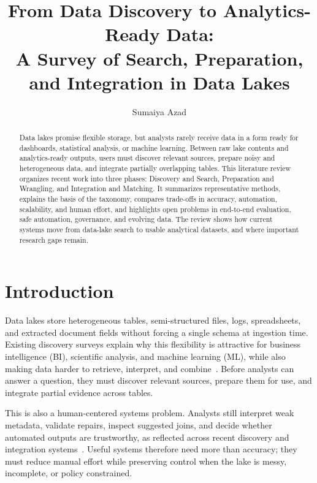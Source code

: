 \documentclass[sigconf]{acmart}
\begin{document}
\pagestyle{plain}

\title{From Data Discovery to Analytics-Ready Data:\\A Survey of Search, Preparation, and Integration in Data Lakes}

\author{Sumaiya Azad}

\renewcommand{\shortauthors}{Azad}

\begin{abstract}
Data lakes promise flexible storage, but analysts rarely receive data in a form ready for dashboards, statistical analysis, or machine learning. Between raw lake contents and analytics-ready outputs, users must discover relevant sources, prepare noisy and heterogeneous data, and integrate partially overlapping tables. This literature review organizes recent work into three phases: Discovery and Search, Preparation and Wrangling, and Integration and Matching. It summarizes representative methods, explains the basis of the taxonomy, compares trade-offs in accuracy, automation, scalability, and human effort, and highlights open problems in end-to-end evaluation, safe automation, governance, and evolving data. The review shows how current systems move from data-lake search to usable analytical datasets, and where important research gaps remain.
\end{abstract}

\maketitle

\section{Introduction}
Data lakes store heterogeneous tables, semi-structured files, logs, spreadsheets, and extracted document fields without forcing a single schema at ingestion time. Existing discovery surveys explain why this flexibility is attractive for business intelligence (BI), scientific analysis, and machine learning (ML), while also making data harder to retrieve, interpret, and combine~\cite{10.1145/3555041.3589409,10.14778/3750601.3750694}. Before analysts can answer a question, they must discover relevant sources, prepare them for use, and integrate partial evidence across tables.

This is also a human-centered systems problem. Analysts still interpret weak metadata, validate repairs, inspect suggested joins, and decide whether automated outputs are trustworthy, as reflected across recent discovery and integration systems~\cite{10.14778/3659437.3659461,10.1145/3555041.3589732,10.14778/3742728.3742757}. Useful systems therefore need more than accuracy; they must reduce manual effort while preserving control when the lake is messy, incomplete, or policy constrained.
\end{document}

